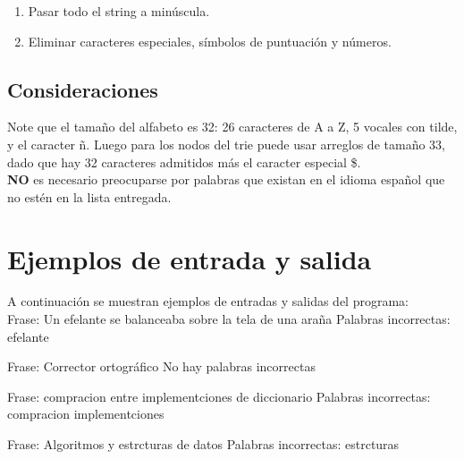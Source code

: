 \documentclass[dcc]{fcfmcourse}
\newenvironment{codebox} {\small \ttfamily \bgroup\obeylines} {\egroup}
\begin{document}
\begin{enumerate}
    \item Pasar todo el string a minúscula.
    \item Eliminar caracteres especiales, símbolos de puntuación y números.
\end{enumerate}

\subsection{Consideraciones}

Note que el tamaño del alfabeto es 32: 26 caracteres de A a Z, 5 vocales con tilde, y el caracter ñ. Luego para los nodos del trie puede usar arreglos de tamaño 33, dado que hay 32 caracteres admitidos más el caracter especial \$. \\

\textbf{NO} es necesario preocuparse por palabras que existan en el idioma español que no estén en la lista entregada.

\section{Ejemplos de entrada y salida}

A continuación se muestran ejemplos de entradas y salidas del programa: \\

\begin{codebox}
Frase: Un efelante se balanceaba sobre la tela de una araña
Palabras incorrectas:
efelante
\end{codebox}

\vspace{4ex}

\begin{codebox}
Frase: Corrector ortográfico
No hay palabras incorrectas
\end{codebox}

\vspace{4ex}

\begin{codebox}
Frase: compracion entre implementciones de diccionario
Palabras incorrectas:
compracion
implementciones
\end{codebox}

\vspace{4ex}

\begin{codebox}
Frase: Algoritmos y estrcturas de datos
Palabras incorrectas:
estrcturas
\end{codebox}
\end{document}
